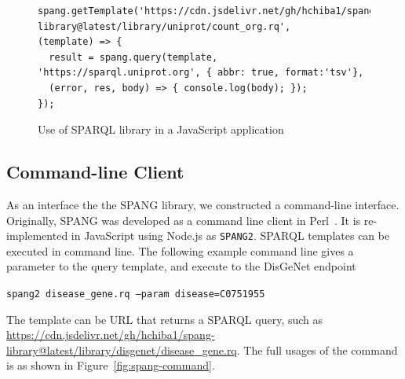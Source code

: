 \documentclass[runningheads]{llncs}
\begin{document}
\begin{figure}[!t]
\begin{scriptsize}
\begin{verbatim}
spang.getTemplate('https://cdn.jsdelivr.net/gh/hchiba1/spang-library@latest/library/uniprot/count_org.rq', 
(template) => {
  result = spang.query(template, 'https://sparql.uniprot.org', { abbr: true, format:'tsv'}, 
  (error, res, body) => { console.log(body); });
});
\end{verbatim}
\end{scriptsize}
\caption{Use of SPARQL library in a JavaScript application}
\label{fig:jsdelivr}
\end{figure}


\subsection{Command-line Client}
As an interface the the SPANG library, we constructed a command-line interface.
Originally, SPANG was developed as a command line client in Perl~\cite{spang}.
It is re-implemented in JavaScript using Node.js as \texttt{SPANG2}.
SPARQL templates can be executed in command line.
The following example command line gives a parameter to the query template, and execute to the DisGeNet endpoint

\texttt{spang2 disease\_gene.rq --param disease=C0751955}

The template can be URL that returns a SPARQL query, such as \url{https://cdn.jsdelivr.net/gh/hchiba1/spang-library@latest/library/disgenet/disease_gene.rq}. The full usages of the command is as shown in Figure~\ref{fig:spang-command}.
\end{document}
